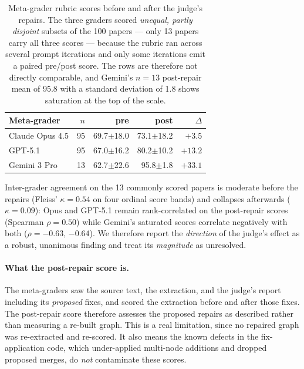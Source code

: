 \documentclass[10pt,twocolumn,letterpaper]{article}
\begin{document}
\begin{table}[t]
\centering
\small
\begin{tabular}{lrrrr}
\toprule
\textbf{Meta-grader} & \textbf{$n$} & \textbf{pre} & \textbf{post} & \textbf{$\Delta$} \\
\midrule
Claude Opus 4.5 & 95 & 69.7$\pm$18.0 & 73.1$\pm$18.2 & $+3.5$ \\
GPT-5.1         & 95 & 67.0$\pm$16.2 & 80.2$\pm$10.2 & $+13.2$ \\
Gemini 3 Pro    & 13 & 62.7$\pm$22.6 & 95.8$\pm$1.8  & $+33.1$ \\
\bottomrule
\end{tabular}
\caption{Meta-grader rubric scores before and after the judge's repairs. The
three graders scored \emph{unequal, partly disjoint} subsets of the 100 papers
--- only 13 papers carry all three scores --- because the rubric ran across
several prompt iterations and only some iterations emit a paired pre/post score.
The rows are therefore not directly comparable, and Gemini's $n{=}13$ post-repair
mean of 95.8 with a standard deviation of 1.8 shows saturation at the top of the
scale.}
\label{tab:graders}
\end{table}

Inter-grader agreement on the 13 commonly scored papers is moderate before the
repairs (Fleiss' $\kappa = 0.54$ on four ordinal score bands) and collapses
afterwards ($\kappa = 0.09$): Opus and GPT-5.1 remain rank-correlated on the
post-repair scores (Spearman $\rho = 0.50$) while Gemini's saturated scores
correlate negatively with both ($\rho = -0.63$, $-0.64$). We therefore report the
\emph{direction} of the judge's effect as a robust, unanimous finding and treat
its \emph{magnitude} as unresolved.

\paragraph{What the post-repair score is.} The meta-graders saw the source text,
the extraction, and the judge's report including its \emph{proposed} fixes, and
scored the extraction before and after those fixes. The post-repair score
therefore assesses the proposed repairs as described rather than measuring a
re-built graph. This is a real limitation, since no repaired graph was
re-extracted and re-scored. It also means the known defects in the fix-application
code, which under-applied multi-node additions and dropped proposed merges, do
\emph{not} contaminate these scores.
\end{document}
